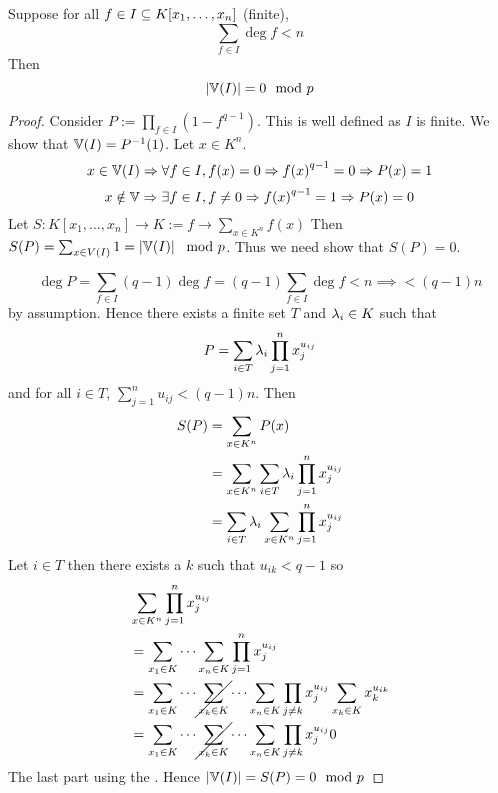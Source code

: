 \begin{prop}[Chevalley]
    Suppose for all $f \in I \subseteq K[x_1, \dots , x_n]$ (finite), 
    \[\sum_{f \in I} \deg f < n\]
    Then 
    \[\left\vert \mathbb{V}(I) \right\vert = 0 \mod p\]
\end{prop}
\begin{proof}
    Consider $P := \prod_{f \in I} (1 - f^{q-1})$.
    This is well defined as $I$ is finite.
    We show that $\mathbb{V}(I) = P^{-1} (1)$.
    Let $x \in K^n$.
    \[
        x \in \mathbb{V}(I) \Rightarrow \forall f \in I, f(x) = 0 
        \Rightarrow  {f(x)}^{q - 1} = 0 
        \Rightarrow P(x) = 1
    \]
    \[
        x \notin \mathbb{V} \Rightarrow
        \exists f \in I, f \ne 0
        \Rightarrow {f(x)}^{q - 1} = 1
        \Rightarrow P(x) = 0
    \]
    Let 
    $S : K[x_1 ,\dots, x_n] \to K := f \to \sum_{x \in K^n} f(x)$
    Then $S(P) = \sum_{x \in V(I)} 1 = \left\vert \mathbb{V}(I) \right\vert \mod p$.
    Thus we need show that $S(P) = 0$.

    \[\deg P = \sum_{f \in I} (q - 1)\deg f 
    = (q - 1) \sum_{f \in I} \deg f < n \implies < (q - 1) n\]
    by assumption.
    Hence there exists a finite set $T$ and $\lambda_i \in K$ such that
    \[P = \sum_{i \in T} \lambda_i \prod_{j = 1}^n x_j^{u_{ij}}\]
    and for all $i \in T$, $\sum_{j = 1}^n u_{ij} < (q - 1) n$.
    Then 
    \begin{align*}
        S(P) &= \sum_{x \in K^n} P(x)\\
            &= \sum_{x\in K^n} \sum_{i \in T} \lambda_i 
            \prod_{j = 1}^n x_j^{u_{ij}}\\
            &= \sum_{i \in T} \lambda_i \sum_{x\in K^n} 
            \prod_{j = 1}^n x_j^{u_{ij}}\\
    \end{align*}
    Let $i \in T$ then there exists a $k$ such that 
    $u_{ik} < q - 1$ so
    \begin{align*}
        & \sum_{x\in K^n} \prod_{j = 1}^n x_j^{u_{ij}}\\
        &= \sum_{x_1 \in K} \cdots \sum_{x_n \in K} 
        \prod_{j = 1}^n x_j^{u_{ij}}\\
        &= \sum_{x_1 \in K} \cdots \cancel{\sum_{x_k \in K}} 
        \cdots \sum_{x_n \in K} 
        \prod_{j \ne k} x_j^{u_{ij}} \sum_{x_k \in K} x_k^{u_{ik}}\\
        &= \sum_{x_1 \in K} \cdots \cancel{\sum_{x_k \in K}} 
        \cdots \sum_{x_n \in K} 
        \prod_{j \ne k} x_j^{u_{ij}} 0
    \end{align*}
    The last part using the .
    Hence $\left\vert \mathbb{V}(I) \right\vert = S(P) = 0 \mod p$
\end{proof}

